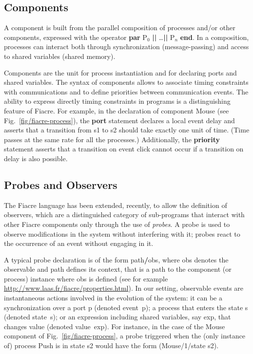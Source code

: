 \documentclass[a4paper]{scrartcl}
\def\code#1{\textsf{\small\bfseries #1}}
\def\vars#1{\textsf{\small #1}}
\begin{document}
\subsection{Components} A {component} is built from the parallel
composition of processes and/or other components, expressed with the
operator \code{par} \vars{P}$_0$ \code{||} \dots \code{||}
\vars{P}$_n$ \code{end}. In a composition, processes can interact both
through synchronization (message-passing) and access to shared
variables (shared memory).

Components are the unit for process instantiation and for declaring
ports and shared variables. The syntax of components allows to
associate timing constraints with communications and to define
priorities between communication events. The ability to express
directly timing constraints in programs is a distinguishing feature of
Fiacre. For example, in the declaration of component \vars{Mouse} (see
Fig.~\ref{fig/fiacre-process}), the \code{port} statement declares a
local event \vars{delay} and asserts that a transition from \vars{s1}
to \vars{s2} should take exactly one unit of time. (Time passes at the
same rate for all the processes.) Additionally, the \code{priority}
statement asserts that a transition on event \vars{click} cannot occur
if a transition on \vars{delay} is also possible.
 
\subsection{Probes and Observers} 
The Fiacre language has been extended, recently, to allow the
definition of {observers}, which are a distinguished category of
sub-programs that interact with other Fiacre components only through
the use of \emph{probes}. A probe is used to observe modifications in
the system without interfering with it; probes react to the occurrence
of an event without engaging in it.

A typical probe declaration is of the form
\vars{path}\code{/}\vars{obs}, where \vars{obs} denotes the observable
and \vars{path} defines its context, that is a path to the component
(or process) instance where \vars{obs} is defined (see for example
{\footnotesize\url{http://www.laas.fr/fiacre/properties.html}}).  In
our setting, observable events are instantaneous actions involved in
the evolution of the system: it can be a synchronization over a port
\vars{p} (denoted \vars{event~p}); a process that enters the state
\vars{s} (denoted \vars{state~s}); or an expression including shared
variables, say \vars{exp}, that changes value (denoted
\vars{value~exp}). For instance, in the case of the \vars{Mouse}
component of Fig.~\ref{fig/fiacre-process}, a probe triggered when the
(only instance of) process \vars{Push} is in state \vars{s2} would
have the form \vars{(Mouse/1/state s2)}. 
\end{document}

